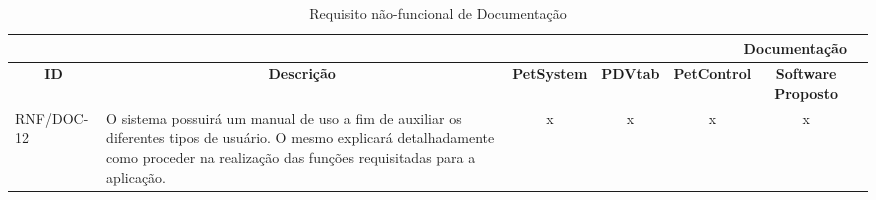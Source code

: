\documentclass[12pt,openright,twoside,a4paper,english,french,spanish,brazil]{abntex2}
\begin{document}
\begin{landscape}
\begin{table}[!htpb]
\begin{small}
\begin{tabular}{|p{3cm}|p{}|c|c|c|cc|}
    \bottomrule
\end{tabular}%
\end{small}
\end{table}
\begin{table}[!htpb]
\centering
\caption{Requisito não-funcional de Documentação}\label{tab:RNF_DOC}
\begin{small} 
\setlength{\tabcolsep}{3pt}
\begin{tabular}{|p{3cm}|p{}|c|c|c|cc|}
\toprule
    \multicolumn{6}{r}{\textbf{Documentação}} \\
    \midrule
    \multicolumn{1}{c}{\textbf{ID}} & \multicolumn{1}{c}{\textbf{Descrição}} & \multicolumn{1}{c}{\textbf{PetSystem}} & \multicolumn{1}{c}{\textbf{PDVtab}} & \multicolumn{1}{c}{\textbf{PetControl}} & \multicolumn{1}{c}{\textbf{Software Proposto}} \\
    RNF/DOC-12 & O sistema possuirá um manual de uso a fim de auxiliar os diferentes tipos de usuário. O mesmo explicará detalhadamente como proceder na realização das funções requisitadas para a aplicação. & x & x & x & x \\
    \bottomrule
\end{tabular}%
\end{small}
\end{table}
\end{landscape}
\newpage




%



\end{document}
